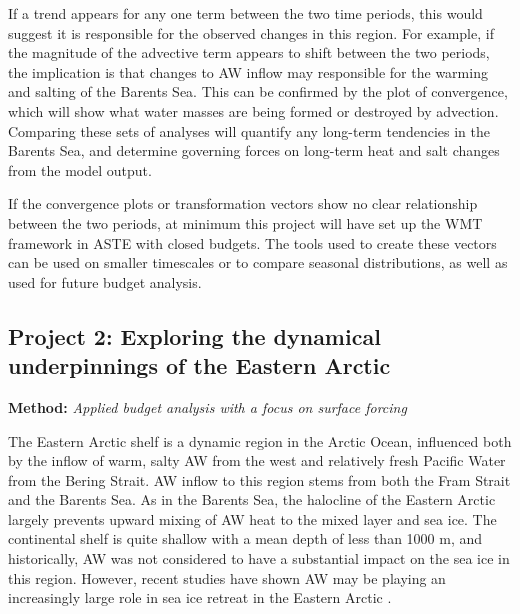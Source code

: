 \documentclass[a4paper,12pt]{article}
\begin{document}
    If a trend appears for any one term between the two time periods, this would suggest it is responsible for the observed changes in this region. For example, if the magnitude of the advective term appears to shift between the two periods, the implication is that changes to AW inflow may responsible for the warming and salting of the Barents Sea. This can be confirmed by the plot of convergence, which will show what water masses are being formed or destroyed by advection. Comparing these sets of analyses will quantify any long-term tendencies in the Barents Sea, and determine governing forces on long-term heat and salt changes from the model output.

    If the convergence plots or transformation vectors show no clear relationship between the two periods, at minimum this project will have set up the WMT framework in ASTE with closed budgets. The tools used to create these vectors can be used on smaller timescales or to compare seasonal distributions, as well as used for future budget analysis.

    \subsection{Project 2: Exploring the dynamical underpinnings of the Eastern Arctic}

    
    \begin{tcolorbox}[minipage,colback=columbiablue,arc=10pt,outer arc=10pt]
    \centering
    \textbf{Method:}	\emph{Applied budget analysis with a focus on surface forcing}\label{sec2_1}
    \end{tcolorbox}

    The Eastern Arctic shelf is a dynamic region in the Arctic Ocean, influenced both by the inflow of warm, salty AW from the west and relatively fresh Pacific Water from the Bering Strait. AW inflow to this region stems from both the Fram Strait and the Barents Sea. As in the Barents Sea, the halocline of the Eastern Arctic largely prevents upward mixing of AW heat to the mixed layer and sea ice. The continental shelf is quite shallow with a mean depth of less than 1000 m, and historically, AW was not considered to have a substantial impact on the sea ice in this region. However, recent studies have shown AW may be playing an increasingly large role in sea ice retreat in the Eastern Arctic \cite{Carmack2015}.
    
\end{document}
